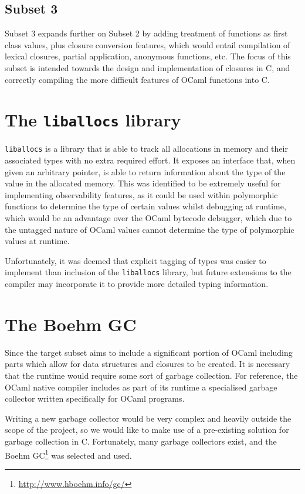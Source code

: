 \subsection{Subset 3}

Subset 3 expands further on Subset 2 by adding treatment of functions as first
class values, plus closure conversion features, which would entail compilation
of lexical closures, partial application, anonymous functions, etc. The focus of
this subset is intended towards the design and implementation of closures in C,
and correctly compiling the more difficult features of OCaml functions into C.

\section{The \texttt{liballocs} library}

\texttt{liballocs} \cite{liballocs} is a library that is able to track all
allocations in memory and their associated types with no extra required effort.
It exposes an interface that, when given an arbitrary pointer, is able to return
information about the type of the value in the allocated memory. This was
identified to be extremely useful for implementing observability features, as it
could be used within polymorphic functions to determine the type of certain
values whilst debugging at runtime, which would be an advantage over the OCaml
bytecode debugger, which due to the untagged nature of OCaml values cannot
determine the type of polymorphic values at runtime.

Unfortunately, it was deemed that explicit tagging of types was easier to
implement than inclusion of the \texttt{liballocs} library, but future
extensions to the compiler may incorporate it to provide more detailed typing
information.

\section{The Boehm GC}

Since the target subset aims to include a significant portion of OCaml including
parts which allow for data structures and closures to be created. It is
necessary that the runtime would require some sort of garbage collection. For
reference, the OCaml native compiler includes as part of its runtime a
specialised garbage collector written specifically for OCaml programs.

Writing a new garbage collector would be very complex and heavily outside the
scope of the project, so we would like to make use of a pre-existing solution
for garbage collection in C. Fortunately, many garbage collectors exist, and the
Boehm GC\footnote{\url{http://www.hboehm.info/gc/}} was selected and used.

